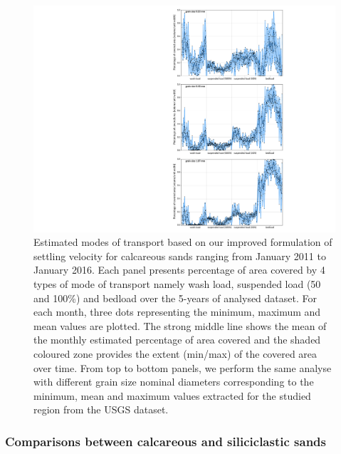 \documentclass[9pt,twocolumn,twoside]{pnas-new}
\begin{document}
\begin{figure}%
\centering
\includegraphics[width=.92\linewidth]{fig3}
\caption{Estimated modes of transport based on our improved formulation of settling velocity for calcareous sands ranging from January 2011 to January 2016. Each panel presents percentage of area covered by 4 types of mode of transport namely wash load, suspended load (50 and 100\%) and bedload over the 5-years of analysed dataset. For each month, three dots representing the minimum, maximum and mean values are plotted. The strong middle line shows the mean of the monthly estimated percentage of area covered and the shaded coloured zone provides the extent (min/max) of the covered area over time. From top to bottom panels, we perform the same analyse with different grain size nominal diameters corresponding to the minimum, mean and maximum values extracted for the studied region from the USGS dataset.}
\label{fig:transport}
\end{figure}

\subsubsection*{Comparisons between calcareous and siliciclastic sands}
\end{document}
